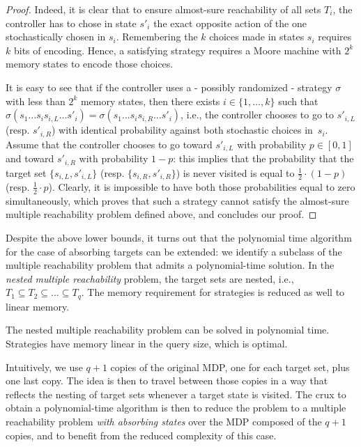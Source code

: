 \documentclass{llncs}
\newcommand{\strat}{\ensuremath{\sigma} }
\begin{document}
\begin{proof}
Indeed, it is clear that to ensure almost-sure reachability of all sets $T_{i}$, the controller has to chose in state $s'_{i}$ the exact opposite action of the one stochastically chosen in $s_{i}$. Remembering the $k$ choices made in states $s_{i}$ requires $k$ bits of encoding. Hence, a satisfying strategy requires a Moore machine with $2^{k}$ memory states to encode those choices.

It is easy to see that if the controller uses a - possibly randomized - strategy $\strat$ with less than $2^{k}$ memory states, then there exists $i \in \{1, \ldots{}, k\}$ such that $\strat(s_{1}\ldots{}s_{i}s_{i,L}\ldots{}s'_{i}) = \strat(s_{1}\ldots{}s_{i}s_{i,R}\ldots{}s'_{i})$, i.e., the controller chooses to go to $s'_{i,L}$ (resp. $s'_{i,R}$) with identical probability against both stochastic choices in~$s_{i}$. Assume that the controller chooses to go toward $s'_{i,L}$ with probability $p \in \left[ 0, 1\right] $ and toward $s'_{i,R}$ with probability $1-p$: this implies that the probability that the target set $\{s_{i,L},s'_{i,L}\}$ (resp. $\{s_{i,R},s'_{i,R}\}$) is never visited is equal to $\frac{1}{2} \cdot (1-p)$ (resp. $\frac{1}{2} \cdot p$). Clearly, it is impossible to have both those probabilities equal to zero simultaneously, which proves that such a strategy cannot satisfy the almost-sure multiple reachability problem defined above, and concludes our proof.
\end{proof}

Despite the above lower bounds, it turns out that the polynomial time algorithm for the case of absorbing targets can be extended:
we identify a subclass of the multiple reachability problem that admits a polynomial-time solution.
In the \emph{nested multiple reachability} problem, the target sets are nested, i.e., 
$T_1 \subseteq T_{2} \subseteq \ldots{} \subseteq T_q$.
The memory requirement for strategies is reduced as well to linear memory.

\begin{theorem}
  \label{thm:monotonic-reach}
  The nested multiple reachability problem can be solved in polynomial time.
  Strategies have memory linear in the query size, which is optimal.
\end{theorem}

 Intuitively, we use $q+1$ copies of the original MDP, one for each target set, plus one last copy. The idea is then to travel between those copies in a way that reflects the nesting of target sets whenever a target state is visited. The crux to obtain a polynomial-time algorithm is then to reduce the problem to a multiple reachability problem \textit{with absorbing states} over the MDP composed of the $q+1$ copies, and to benefit from the reduced complexity of this case.
 
\end{document}
